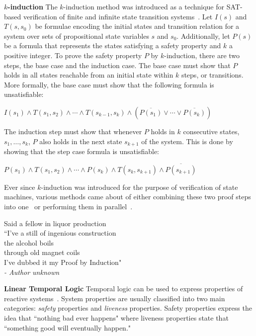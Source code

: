 \textbf{$k$-induction}
\label{subsubsec:kInd}
The $k$-induction method was introduced as a technique for SAT-based verification of finite and infinite state transition systems~\cite{sheeran2000checking}. Let $I(s)$ and $T(s, s_0)$ be formulae encoding the initial states and transition relation for a system over sets of propositional state variables $s$ and $s_0$. Additionally, let $P(s)$ be a formula that represents the states satisfying a safety property and $k$ a positive integer. To prove the safety property $P$ by $k$-induction, there are two steps, the base case and the induction case. The base case must show that $P$ holds in all states reachable from an initial state within $k$ steps, or transitions. More formally, the base case must show that the following formula is unsatisfiable:

\begin{center}
$I(s_1) \land T(s_1, s_2) \land \cdots \land T(s_{k−1}, s_k) \land (\overline{P(s_1)} \lor \cdots \lor \overline{P(s_k)})$
\end{center}

The induction step must show that whenever $P$ holds in $k$ consecutive states, $s_1, \ldots, s_k$, $P$ also holds in the next state $s_{k+1}$ of the system. This is done by showing that the step case formula is unsatisfiable:

\begin{center}
$P(s_1) \land T(s_1, s_2) \land \cdots \land P(s_k) \land T(s_{k}, s_{k+1}) \land \overline{P(s_{k+1})}$
\end{center}

Ever since $k$-induction was introduced for the purpose of verification of state machines, various methods came about of either combining these two proof steps into one~\cite{donaldson2011software} or performing them in parallel~\cite{kahsai2011pkind}. \\

\begin{center}
Said a fellow in liquor production\\
``I’ve a still of ingenious construction\\
the alcohol boils\\
through old magnet coils\\
I’ve dubbed it my Proof by Induction"\\
\textit{- Author unknown}
\end{center}

\textbf{Linear Temporal Logic}
Temporal logic can be used to express properties of reactive systems~\cite{Bozzano:2010:DSA:1951720}. System properties are usually classified into two main categories: {\em safety} properties and {\em liveness} properties. Safety properties express the idea that ``nothing bad ever happens" where liveness properties state that ``something good will eventually happen." 

